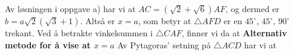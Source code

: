 {	
	Av løsningen i oppgave a) har vi at $ {AC=(\sqrt{2}+\sqrt{6})AF}$, og dermed er $ b=a\sqrt{2}(\sqrt{3}+1)$. Altså er $ x=a $, som betyr at $ \triangle AFD $ er en $ 45^\circ $, $ 45^\circ $, $ 90^\circ $ trekant. Ved å betrakte vinkelsummen i $ \triangle CAF $, finner vi da at
	\textbf{Alternativ metode for å vise at \boldmath $ x=a $} \os
	Av Pytagoras' setning på $ \triangle ACD $ har vi at
	
}



